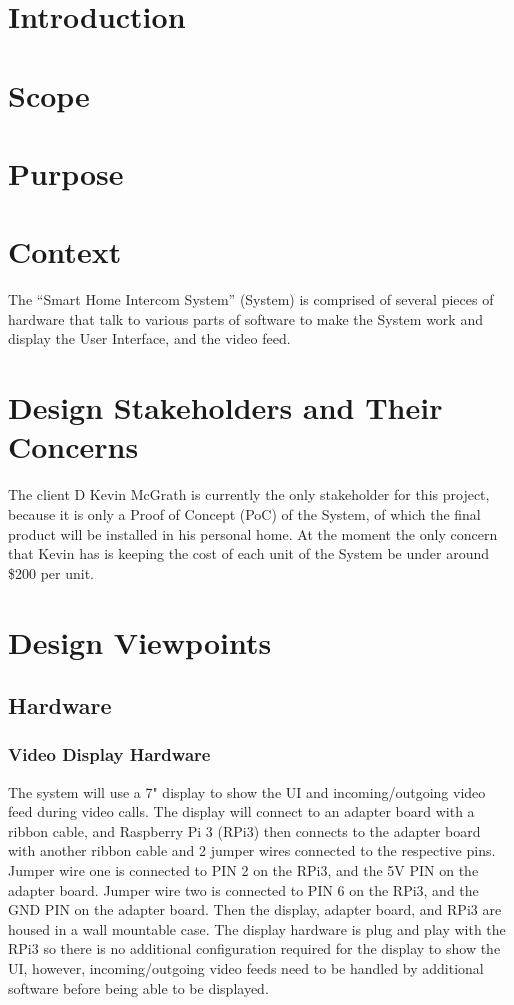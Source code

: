 \documentclass[onecolumn, draftclsnofoot,10pt, compsoc]{IEEEtran}
\begin{document}
\section{Introduction}

\section{Scope}

\section{Purpose}

\section{Context}
The “Smart Home Intercom System” (System) is comprised of several pieces of hardware that talk to various parts of software to make the System work and display the User Interface, and the video feed.


\section{Design Stakeholders and Their Concerns}
The client D Kevin McGrath is currently the only stakeholder for this project, because it is only a Proof of Concept (PoC) of the System, of which the final product will be installed in his personal home. 
At the moment the only concern that Kevin has is keeping the cost of each unit of the System be under around \$200 per unit.

\section{Design Viewpoints}

\subsection{Hardware}
\subsubsection{Video Display Hardware}
The system will use a 7" display to show the UI and incoming/outgoing video feed during video calls.
The display will connect to an adapter board with a ribbon cable, and Raspberry Pi 3 (RPi3) then connects to the adapter board with another ribbon cable and 2 jumper wires connected to the respective pins.
Jumper wire one is connected to PIN 2 on the RPi3, and the 5V PIN on the adapter board. Jumper wire two is connected to PIN 6 on the RPi3, and the GND PIN on the adapter board. Then the display, adapter board, and RPi3 are housed in a wall mountable case. The display hardware is plug and play with the RPi3 so there is no additional configuration required for the display to show the UI, however,  incoming/outgoing video feeds need to be handled by additional software before being able to be displayed.
\end{document}
